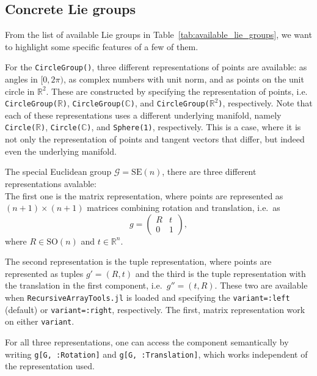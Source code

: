 \documentclass{juliacon}
\begin{document}
\subsection{Concrete Lie groups}\label{subsec:ConcreteLieGroups}

From the list of available Lie groups in Table~\ref{tab:available_lie_groups}, we want to highlight some specific features of a few of them.

For the \verb|CircleGroup()|, three different representations of points are available: as angles in \([0, 2\pi)\), as complex numbers with unit norm, and as points on the unit circle in \(\mathbb{R}^2\).
These are constructed by specifying the representation of points, i.e. \verb|CircleGroup(|$\mathbb R$\verb|)|, \verb|CircleGroup(|$\mathbb C$\verb|)|, and \verb|CircleGroup(|$\mathbb R^2$\verb|)|, respectively. Note that each of these representations uses a different underlying manifold, namely \verb|Circle(|$\mathbb R$\verb|)|, \verb|Circle(|$\mathbb C$\verb|)|, and \verb|Sphere(1)|, respectively.
This is a case, where it is not only the representation of points and tangent vectors that differ, but indeed even the underlying manifold.

The special Euclidean group \(\mathcal G = \mathrm{SE}(n)\), there are three different representations avalable:
\\
The first one is the matrix representation, where points are represented as \((n+1) \times (n+1)\) matrices combining rotation and translation, i.e.\ as
\begin{equation*}
    g = \begin{pmatrix} R & t \\
    0 & 1 \end{pmatrix},
\end{equation*}
where \(R \in \mathrm{SO}(n)\) and \(t \in \mathbb{R}^n\).

The second representation is the tuple representation, where points are represented as tuples \(g' = (R, t)\) and the third is the tuple representation with the translation in the first component, i.e.\ \(g'' = (t, R)\). These two are available when \verb|RecursiveArrayTools.jl| is loaded and specifying the \verb|variant=:left| (default) or \verb|variant=:right|, respectively.
The first, matrix representation work on either \verb|variant|.

For all three representations, one can access the component semantically by writing \verb|g[G, :Rotation]| and \verb|g[G, :Translation]|, which works independent of the representation used.
\end{document}
